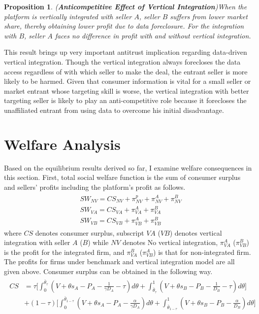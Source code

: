 \documentclass[12pt]{article}
\newtheorem{proposition}{Proposition}
\begin{document}
\begin{proposition}(\textbf{Anticompetitive Effect of Vertical Integration})\label{VIBsuffering}
When the platform is vertically integrated with seller $A$, seller $B$ suffers from lower market share, thereby obtaining lower profit due to data foreclosure. For the integration with $B$, seller $A$ faces no difference in profit with and without vertical integration. 
\end{proposition}

This result brings up very important antitrust implication regarding data-driven vertical integration. Though the vertical integration always forecloses the data access regardless of with which seller to make the deal, the entrant seller is more likely to be harmed. Given that consumer information is vital for a small seller or market entrant whose targeting skill is worse, the vertical integration with better targeting seller is likely to play an anti-competitive role because it forecloses the unaffiliated entrant from using data to overcome his initial disadvantage.


\section{Welfare Analysis}
Based on the equilibrium results derived so far, I examine welfare consequences in this section. First, total social welfare function is the sum of consumer surplus and sellers' profits including the platform's profit as follows.
\begin{align}
\begin{aligned}
&SW_{NV} = CS_{NV} + \pi_{NV}^p + \pi_{NV}^A+\pi_{NV}^B\\
&SW_{VA} = CS_{VA}+\pi^A_{VA}+\pi^B_{VA}\\
&SW_{VB} = CS_{VB}+\pi^A_{VB}+\pi^B_{VB}
\end{aligned}
\end{align}
where $CS$ denotes consumer surplus, subscript $VA$ ($VB$) denotes vertical integration with seller $A$ ($B$) while $NV$ denotes No vertical integration, $\pi^A_{VA}$ ($\pi^B_{VB}$) is the profit for the integrated firm, and $\pi^B_{VA}$ ($\pi^A_{VB}$) is that for non-integrated firm. The profits for firms under benchmark and vertical integration model are all given above. Consumer surplus can be obtained in the following way. 
\begin{align}
\begin{aligned}
CS& = \tau\big[\int_0^{\bar{\theta}_\tau} (V+\theta s_A - P_A -\frac{1}{\gamma D_A}-\tau)d\theta +\int_{\bar{\theta}_\tau}^1 (V+\theta s_B- P_B - \frac{1}{D_B}-\tau)d\theta\big]\\
&+ (1-\tau)\big[\int_0^{\bar{\theta}_{1-\tau}} (V+\theta s_A - P_A -\frac{\alpha}{\gamma D_A})d\theta +\int_{\bar{\theta}_{1-\tau}}^1 (V+\theta s_B- P_B - \frac{\alpha}{D_B})d\theta\big]
\end{aligned}
\end{align}
\end{document}
